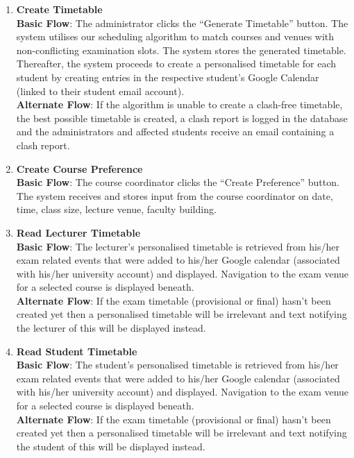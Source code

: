 \documentclass{article}
\begin{document}
\begin{enumerate}
\setlength\itemsep{1em}

\item \textbf{Create Timetable} \\
\textbf{Basic Flow}: The administrator clicks the “Generate Timetable” button. The system utilises our scheduling algorithm to match courses and venues with non-conflicting examination slots. The system stores the generated timetable. Thereafter, the system proceeds to create a personalised timetable for each student by creating entries in the respective student's Google Calendar (linked to their student email account). \\
\textbf{Alternate Flow}: If the algorithm is unable to create a clash-free timetable, the best possible timetable is created, a clash report is logged in the database and the administrators and affected students receive an email containing a clash report.

\item \textbf{Create Course Preference} \\
\textbf{Basic Flow}: The course coordinator clicks the “Create Preference” button. The system receives and stores input from the course coordinator on date, time, class size, lecture venue, faculty building.

\item \textbf{Read Lecturer Timetable} \\
\textbf{Basic Flow}: The lecturer’s personalised timetable is retrieved from his/her exam related events that were added to his/her Google calendar (associated with his/her university account) and displayed. Navigation to the exam venue for a selected course is displayed beneath. \\
\textbf{Alternate Flow}: If the exam timetable (provisional or final) hasn’t been created yet then a personalised timetable will be irrelevant and text notifying the lecturer of this will be displayed instead.

\item \textbf{Read Student Timetable} \\
\textbf{Basic Flow}: The student’s personalised timetable is retrieved from his/her exam related events that were added to his/her Google calendar (associated with his/her university account) and displayed. Navigation to the exam venue for a selected course is displayed beneath. \\
\textbf{Alternate Flow}: If the exam timetable (provisional or final) hasn’t been created yet then a personalised timetable will be irrelevant and text notifying the student of this will be displayed instead.


\end{enumerate}
\end{document}

